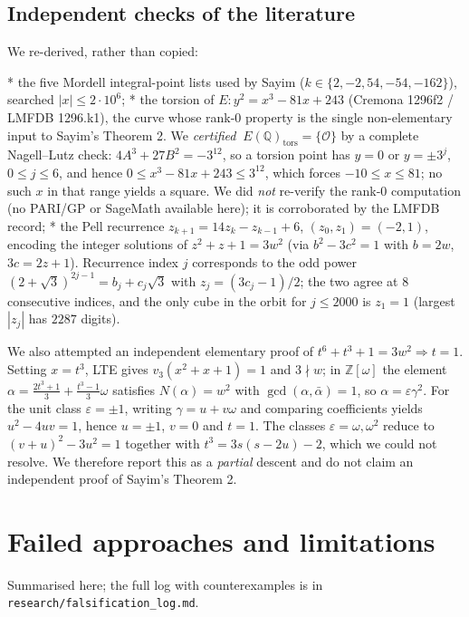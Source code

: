 \documentclass[11pt]{article}
\theoremstyle{definition}
\begin{document}
\subsection{Independent checks of the literature}

We re-derived, rather than copied:

* the five Mordell integral-point lists used by Sayim \cite{sayim2026}
  ($k\in\{2,-2,54,-54,-162\}$), searched $|x|\le2\cdot10^6$;
* the torsion of $E: y^2=x^3-81x+243$ (Cremona 1296f2 / LMFDB 1296.k1), the curve
  whose rank-0 property is the single non-elementary input to Sayim's Theorem 2. We
  \emph{certified} $\ E(\mathbb Q)_{\mathrm{tors}}=\{\mathcal O\}$ by a complete
  Nagell--Lutz check: $4A^3+27B^2=-3^{12}$, so a torsion point has $y=0$ or
  $y=\pm3^j$, $0\le j\le6$, and hence $0\le x^3-81x+243\le 3^{12}$, which forces
  $-10\le x\le 81$; no such $x$ in that range yields a square. We did
  \emph{not} re-verify the rank-0 computation (no PARI/GP or SageMath available here);
  it is corroborated by the LMFDB record;
* the Pell recurrence $z_{k+1}=14z_k-z_{k-1}+6$, $(z_0,z_1)=(-2,1)$, encoding the
  integer solutions of $z^2+z+1=3w^2$ (via $b^2-3c^2=1$ with $b=2w$, $3c=2z+1$).
  Recurrence index $j$ corresponds to the odd power $(2+\sqrt3)^{2j-1}=b_j+c_j\sqrt3$
  with $z_j=(3c_j-1)/2$; the two agree at 8 consecutive indices, and the only cube in
  the orbit for $j\le2000$ is $z_1=1$ (largest $|z_j|$ has $2287$ digits).

We also attempted an independent elementary proof of
$t^6+t^3+1=3w^2\Rightarrow t=1$. Setting $x=t^3$, LTE gives
$v_3(x^2+x+1)=1$ and $3\nmid w$; in $\mathbb Z[\omega]$ the element
$\alpha=\frac{2t^3+1}{3}+\frac{t^3-1}{3}\omega$ satisfies
$N(\alpha)=w^2$ with $\gcd(\alpha,\bar\alpha)=1$, so $\alpha=\varepsilon\gamma^2$.
For the unit class $\varepsilon=\pm1$, writing $\gamma=u+v\omega$ and comparing
coefficients yields $u^2-4uv=1$, hence $u=\pm1$, $v=0$ and $t=1$. The classes
$\varepsilon=\omega,\omega^2$ reduce to $(v+u)^2-3u^2=1$ together with
$t^3=3s(s-2u)-2$, which we could not resolve. We therefore report this as a
\emph{partial} descent and do not claim an independent proof of Sayim's Theorem 2.

\section{Failed approaches and limitations}

Summarised here; the full log with counterexamples is in
\texttt{research/falsification\_log.md}.
\end{document}
